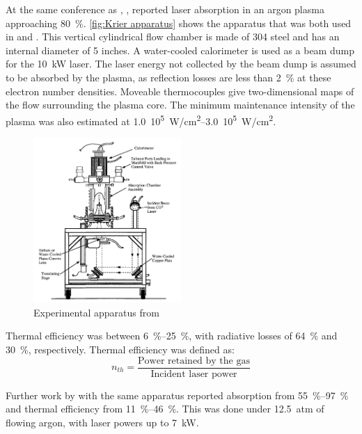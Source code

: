         At the same conference as \textcite{keeferPowerAbsorptionLasersustained1986a}, \textcite{krierContinuousWaveLaser1986a}, reported laser absorption in an argon plasma approaching \qty{80}{\%}. \autoref{fig:Krier apparatus} shows the apparatus that was both used in \textcite{krierContinuousWaveLaser1986a} and \textcite{zerkleLasersustainedArgonPlasmas1990}. This vertical cylindrical flow chamber is made of 304 steel and has an internal diameter of 5 inches.  A water-cooled calorimeter is used as a beam dump for the \qty{10}{kW}  laser. The laser energy not collected by the beam dump is assumed to be absorbed by the plasma, as reflection losses are less than \qty{2}{\%} at these electron number densities. Moveable thermocouples give two-dimensional maps of the flow surrounding the plasma core. The minimum maintenance intensity of the plasma was also estimated at \qtyrange{1.0}{3.0}{10^5 W/cm^2}.
        \begin{figure}[!ht]
            \centering
            \includegraphics[width=0.5\textwidth]{assets/2 background/Illinois (Krier) Apparatus.png}
            \caption{Experimental apparatus from \textcite{zerkleLasersustainedArgonPlasmas1990}}
            \label{fig:Krier apparatus}
        \end{figure}
        Thermal efficiency was between \qtyrange{6}{25}{\%}, with radiative losses of \qty{64}{\%} and \qty{30}{\%}, respectively. Thermal efficiency was defined as:
        \[n_{th} =  \frac{\text{Power retained by the gas}}{\text{Incident laser power}}\]
        
        Further work by \textcite{zerkleLasersustainedArgonPlasmas1990} with the same apparatus reported absorption from \qtyrange{55}{97}{\%} and thermal efficiency from \qtyrange{11}{46}{\%}. This was done under \qtylist{1 2.5}{atm} of flowing argon, with laser powers up to \qty{7}{kW}.

